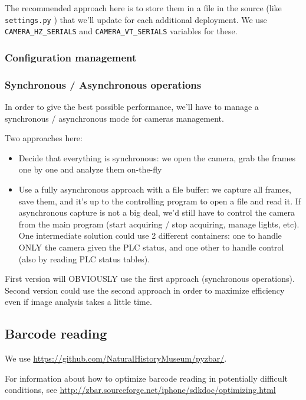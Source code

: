 The recommended approach here is to store them in a file in the source (like \texttt{settings.py} ) that we'll update for each additional deployment. We use \texttt{CAMERA\_HZ\_SERIALS} and \texttt{CAMERA\_VT\_SERIALS} variables for these.

\subsubsection{Configuration management}


\subsubsection{Synchronous / Asynchronous operations}

In order to give the best possible performance, we'll have to manage a synchronous / asynchronous mode
for cameras management.

Two approaches here:

\begin{itemize}
    \item Decide that everything is synchronous: we open the camera, grab the frames one by one
        and analyze them on-the-fly
    \item Use a fully asynchronous approach with a file buffer: we capture all frames, save them,
        and it's up to the controlling program to open a file and read it.
        If asynchronous capture is not a big deal, we'd still have to control the camera from the
        main program (start acquiring / stop acquiring, manage lights, etc).
        One intermediate solution could use 2 different containers: one to handle ONLY the camera
        given the PLC status, and one other to handle control (also by reading PLC status tables).
\end{itemize}

First version will OBVIOUSLY use the first approach (synchronous operations). Second version
could use the second approach in order to maximize efficiency even if image analysis takes
a little time.

\subsection{Barcode reading}

We use \url{https://github.com/NaturalHistoryMuseum/pyzbar/}.

For information about how to optimize barcode reading in potentially difficult conditions, see \url{http://zbar.sourceforge.net/iphone/sdkdoc/optimizing.html}


